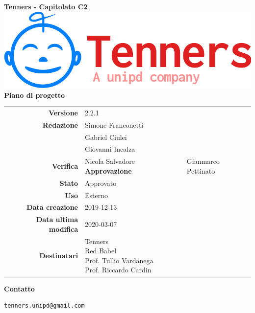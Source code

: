 \begin{titlepage}
	\begin{center}
		\large \textbf{Tenners - Capitolato C2}
		\vfill
		\includegraphics[scale = 0.3]{./res/img/logo.png}\\
		\vfill
		\Huge \textbf{Piano di progetto}

        \vfill
        \large

        \begin{tabular}{r|l}
                        \textbf{Versione} & 2.2.1 \\
                        \textbf{Redazione} &
                        Simone Franconetti\\&
                        Gabriel Ciulei\\&
												Giovanni Incalza\\
                        \textbf{Verifica} &
                        Nicola Salvadore
                        \textbf{Approvazione} & Gianmarco Pettinato\\
                        \textbf{Stato} & Approvato \\
                        \textbf{Uso} &  Esterno\\
                        \textbf{Data creazione} &  2019-12-13\\
                        \textbf{Data ultima modifica} &  2020-03-07\\
                        \textbf{Destinatari} & \parbox[t]{5cm}{Tenners\\Red Babel\\Prof. Tullio Vardanega\\Prof. Riccardo Cardin}
                \end{tabular}
                \vfill
                \normalsize
                \vfill
                \textbf{Contatto}

                \texttt{tenners.unipd@gmail.com}

	\end{center}
\end{titlepage}

